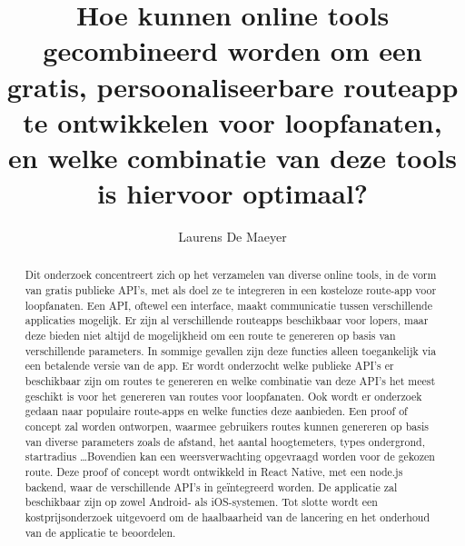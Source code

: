 \documentclass{hogent-article}
\title{Hoe kunnen online tools gecombineerd worden om een gratis, persoonaliseerbare routeapp te ontwikkelen voor loopfanaten, en welke combinatie van deze tools is hiervoor optimaal?}
\author{Laurens De Maeyer}
\begin{document}
\begin{abstract}
  Dit onderzoek concentreert zich op het verzamelen van diverse online tools, in de vorm van gratis publieke API's, met als doel ze te integreren in een kosteloze route-app voor loopfanaten. Een API, oftewel een interface, maakt communicatie tussen verschillende applicaties mogelijk.
  Er zijn al verschillende routeapps beschikbaar voor lopers, maar deze bieden niet altijd de mogelijkheid om een route te genereren op basis van verschillende parameters. In sommige gevallen zijn deze functies alleen toegankelijk via een betalende versie van de app.
  Er wordt onderzocht welke publieke API's er beschikbaar zijn om routes te genereren en welke combinatie van deze API's het meest geschikt is voor het genereren van routes voor loopfanaten. Ook wordt er onderzoek gedaan naar populaire route-apps en welke functies deze aanbieden.
  Een proof of concept zal worden ontworpen, waarmee gebruikers routes kunnen genereren op basis van diverse parameters zoals de afstand, het aantal hoogtemeters, types ondergrond, startradius \ldots Bovendien kan een weersverwachting opgevraagd worden voor de gekozen route.
  Deze proof of concept wordt ontwikkeld in React Native, met een node.js backend, waar de verschillende API's in geïntegreerd worden. De applicatie zal beschikbaar zijn op zowel Android- als iOS-systemen.
  Tot slotte wordt een kostprijsonderzoek uitgevoerd om de haalbaarheid van de lancering en het onderhoud van de applicatie te beoordelen.
\end{abstract}

\tableofcontents



\printbibliography[heading=bibintoc]
\end{document}
